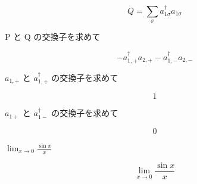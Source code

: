 \documentclass[dvipdfmx,a4paper,11pt]{jsarticle}
\begin{document}
\begin{equation}
  Q = \sum_\sigma a^\dagger_{1\sigma} a_{1\sigma}
  \label{eq:E9}
\end{equation}

P と Q の交換子を求めて

\begin{equation}
  - {a}_{1{,+}}^{\dagger} {a}_{2{,+}} - {a}_{1{,-}}^{\dagger} {a}_{2{,-}}
  \label{eq:E10}
\end{equation}

$a_{1,+}$ と $a^\dagger_{1,+}$ の交換子を求めて

\begin{equation}
  1
  \label{eq:E11}
\end{equation}

$a_{1+}$ と $a^\dagger_{1-}$ の交換子を求めて

\begin{equation}
  0
  \label{eq:E12}
\end{equation}

$\lim_{x \to 0} \frac{\sin x}{x}$

\begin{equation}
  \lim_{x \to 0} \frac{\sin x}{x}
  \label{eq:E13}
\end{equation}
\end{document}
